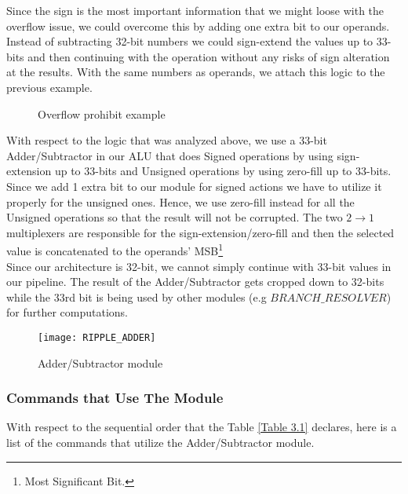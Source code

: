 	Since the sign is the most important information that we might loose with the overflow issue, we could overcome this by adding one extra bit to our operands. Instead of subtracting 32-bit numbers we could sign-extend the values up to 33-bits and then continuing with the operation without any risks of sign alteration at the results. With the same numbers as operands, we attach this logic to the previous example.
	
	\begin{figure}[h!]
		\begin{center}
			\caption{Overflow prohibit example}
			\label{Image3.7}
		\end{center}
	\end{figure}
	\vspace{-4mm}
	
	With respect to the logic that was analyzed above, we use a 33-bit Adder/Subtractor in our ALU that does Signed operations by 
	using sign-extension up to 33-bits and Unsigned operations by using zero-fill up to 33-bits. Since we add 1 extra bit to our module for signed actions we have to utilize it properly for the unsigned ones. Hence, we use zero-fill instead for all the Unsigned operations so that the result will not be corrupted. The two $2\rightarrow1$ multiplexers are responsible for the sign-extension/zero-fill and then the selected value is concatenated to the operands' MSB\footnote{Most Significant Bit.} \\ 
	
	Since our architecture is 32-bit, we cannot simply continue with 33-bit values in our pipeline. The result of the Adder/Subtractor gets cropped down to 32-bits while the 33rd bit is being used by other modules (e.g $BRANCH\_RESOLVER$) for further computations. 
	
	\begin{figure}[h!]
		\begin{center}
			\texttt{[image: RIPPLE\_ADDER]}
			\caption{Adder/Subtractor module}
			\label{Image3.8}
		\end{center}
	\end{figure}
	
	\subsubsection{Commands that Use The Module}

	With respect to the sequential order that the Table \ref{Table 3.1} declares, here is a list of the commands that utilize the Adder/Subtractor module.
	
